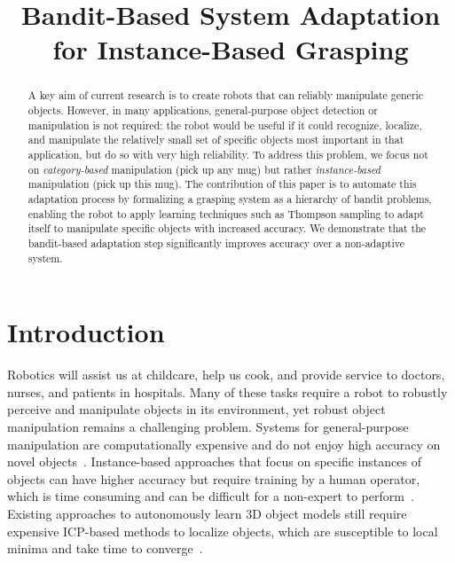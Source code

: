 \documentclass{article}
\title{Bandit-Based System Adaptation for
  Instance-Based Grasping}
\author{}
\begin{document}
\maketitle

\begin{abstract}
A key aim of current research is to create robots that can reliably
manipulate generic objects.  However, in many applications,
general-purpose object detection or manipulation is not required: the
robot would be useful if it could recognize, localize, and manipulate
the relatively small set of specific objects most important in that
application, but do so with very high reliability.  To address this
problem, we focus not on {\em category-based} manipulation (pick up
any mug) but rather {\em instance-based} manipulation (pick up this
mug).  The contribution of this paper is to automate this adaptation
process by formalizing a grasping system as a hierarchy of bandit
problems, enabling the robot to apply learning techniques such as
Thompson sampling to adapt itself to manipulate specific objects with
increased accuracy.  We demonstrate that the bandit-based adaptation
step significantly improves accuracy over a non-adaptive system.




\end{abstract}



\section{Introduction}
Robotics will assist us at childcare, help us cook, and
provide service to doctors, nurses, and patients in hospitals. Many of
these tasks require a robot to robustly perceive and manipulate
objects in its environment, yet robust object manipulation remains a
challenging problem.  Systems for general-purpose manipulation are
computationally expensive and do not enjoy high accuracy on novel
objects~\citep{saxena08}.  Instance-based approaches that focus on
specific instances of objects can have higher accuracy but require
training by a human operator, which is time consuming and can be
difficult for a non-expert to perform~\citep{ork14, lai11, lai11a}.
Existing approaches to autonomously learn 3D object models still
require expensive ICP-based methods to localize objects, which are
susceptible to local minima and take time to
converge~\citep{krainin11}.
\end{document}
